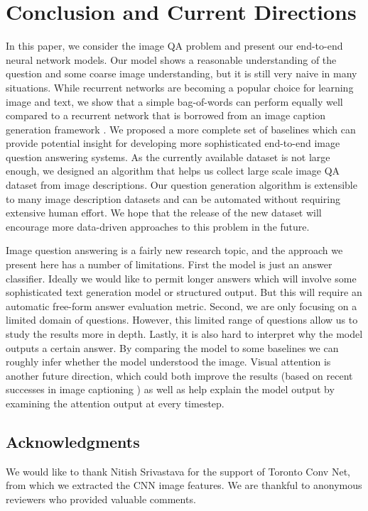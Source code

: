 \documentclass{article}
\renewcommand{\*}[1]{\textbf{#1}}
\begin{document}
\section{Conclusion and Current Directions}
In this paper, we consider the image QA problem and present our end-to-end 
neural network models. Our model shows a reasonable understanding of the 
question and some coarse image understanding, but it is still very naive in 
many situations. While recurrent networks are becoming a popular choice for 
learning image and text, we show that a simple bag-of-words can perform equally 
well compared to a recurrent network that is borrowed from an image caption 
generation framework \cite{vinyals14}. We proposed a more complete set of 
baselines which can provide potential insight for developing more sophisticated 
end-to-end image question answering systems. As the currently available dataset 
is not large enough, we designed an algorithm that helps us collect large scale 
image QA dataset from image descriptions. Our question generation algorithm is 
extensible to many image description datasets and can be automated without 
requiring extensive human effort. We hope that the release of the new dataset 
will encourage more data-driven approaches to this problem in the future.

Image question answering is a fairly new research topic, and the approach we
present here has a number of limitations. First the model is just an answer
classifier. Ideally we would like to permit longer answers which will involve
some sophisticated text generation model or structured output. But this will 
require an automatic free-form answer evaluation metric. Second, we are only 
focusing on a limited domain of questions. However, this limited range of 
questions allow us to study the results more in depth. Lastly, it is also hard 
to interpret why the model outputs a certain answer. By comparing the model to 
some baselines we can roughly infer whether the model understood the image. 
Visual attention is another future direction, which could both improve the 
results (based on recent successes in image captioning \cite{xu15}) as well as 
help explain the model output by examining the attention output at every 
timestep.

\subsection*{Acknowledgments}
We would like to thank Nitish Srivastava for the support of Toronto Conv Net, 
from which we extracted the CNN image features. We are thankful to anonymous 
reviewers who provided valuable comments.
\end{document}
